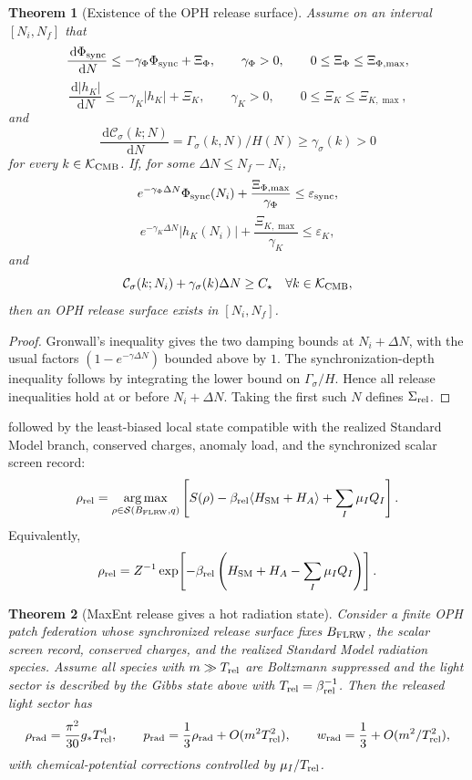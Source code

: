 \documentclass[11pt]{article}
\newtheorem{theorem}{Theorem}[section]
\newcommand{\dd}{\,\mathrm d}
\begin{document}
\begin{theorem}[Existence of the OPH release surface]\label{thm:release-existence}
Assume on an interval \([N_i,N_f]\) that
\[
\frac{\dd\Phi_{\rm sync}}{\dd N}\le-\gamma_\Phi\Phi_{\rm sync}+\Xi_\Phi,
\qquad
\gamma_\Phi>0,
\qquad
0\le\Xi_\Phi\le\Xi_{\Phi,\max},
\]
\[
\frac{\dd |h_K|}{\dd N}\le-\gamma_K|h_K|+\Xi_K,
\qquad
\gamma_K>0,
\qquad
0\le\Xi_K\le\Xi_{K,\max},
\]
and
\[
\frac{\dd\mathcal C_\sigma(k;N)}{\dd N}
=
\Gamma_\sigma(k,N)/H(N)
\ge\gamma_\sigma(k)>0
\]
for every \(k\in\mathcal K_{\rm CMB}\). If, for some \(\Delta N\le N_f-N_i\),
\[
e^{-\gamma_\Phi\Delta N}\Phi_{\rm sync}(N_i)
+
\frac{\Xi_{\Phi,\max}}{\gamma_\Phi}
\le
\varepsilon_{\rm sync},
\]
\[
e^{-\gamma_K\Delta N}|h_K(N_i)|
+
\frac{\Xi_{K,\max}}{\gamma_K}
\le
\varepsilon_K,
\]
and
\[
\mathcal C_\sigma(k;N_i)+\gamma_\sigma(k)\Delta N\ge C_\star
\quad
\forall k\in\mathcal K_{\rm CMB},
\]
then an OPH release surface exists in \([N_i,N_f]\).
\end{theorem}

\begin{proof}
Gronwall's inequality gives the two damping bounds at \(N_i+\Delta N\), with the usual factors
\((1-e^{-\gamma\Delta N})\) bounded above by \(1\). The synchronization-depth inequality follows by
integrating the lower bound on \(\Gamma_\sigma/H\). Hence all release inequalities hold at or before
\(N_i+\Delta N\). Taking the first such \(N\) defines \(\Sigma_{\rm rel}\).
\end{proof}

followed by the least-biased local state compatible with the realized Standard Model branch,
conserved charges, anomaly load, and the synchronized scalar screen record:
\[
\rho_{\rm rel}
=
\underset{\rho\in\mathcal S(B_{\rm FLRW},q)}{\arg\max}
\left[
S(\rho)
-\beta_{\rm rel}\langle H_{\rm SM}+H_A\rangle
+\sum_I\mu_IQ_I
\right].
\]
Equivalently,
\[
\rho_{\rm rel}
=
Z^{-1}\exp\!\left[
-\beta_{\rm rel}
\left(H_{\rm SM}+H_A-\sum_I\mu_IQ_I\right)
\right].
\]
\begin{theorem}[MaxEnt release gives a hot radiation state]\label{thm:maxent-release}
Consider a finite OPH patch federation whose synchronized release surface fixes
\(B_{\rm FLRW}\), the scalar screen record, conserved charges, and the realized Standard Model
radiation species. Assume all species with \(m\gg T_{\rm rel}\) are Boltzmann suppressed and the
light sector is described by the Gibbs state above with \(T_{\rm rel}=\beta_{\rm rel}^{-1}\). Then
the released light sector has
\[
\rho_{\rm rad}
=
\frac{\pi^2}{30}g_\ast T_{\rm rel}^4,
\qquad
p_{\rm rad}
=
\frac13\rho_{\rm rad}
+O(m^2T_{\rm rel}^2),
\qquad
w_{\rm rad}
=
\frac13+O(m^2/T_{\rm rel}^2),
\]
with chemical-potential corrections controlled by \(\mu_I/T_{\rm rel}\).
\end{theorem}
\end{document}

